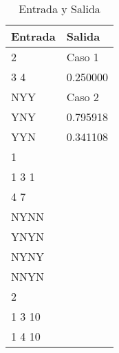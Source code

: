 \begin{table}[htbp]
    \centering
    \caption{Entrada y Salida}
    \begin{tabular}{|p{5cm}|p{5cm}|}
        \hline
        \textbf{Entrada} & \textbf{Salida} \\
        \hline
        2 & Caso 1 \\
        3 4 & 0.250000 \\
        NYY & Caso 2 \\
        YNY & 0.795918 \\
        YYN & 0.341108 \\
        1 & \\
        1 3 1 & \\
        4 7 & \\
        NYNN & \\
        YNYN & \\
        NYNY & \\
        NNYN & \\
        2 & \\
        1 3 10 & \\
        1 4 10 & \\
        \hline
    \end{tabular}
    \label{tab:entrada_salida}
\end{table}
